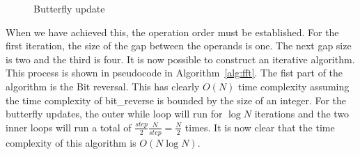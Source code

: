 \ifrelease
\begin{figure}
    \centering
    \caption{Butterfly update \cite{fft:derivation}}
    \label{fig:butterfly:update}
\end{figure}
\fi

When we have achieved this, the operation order must be established. For the first iteration, the size of the gap between the operands is one. The next gap size is two and the third is four. It is now possible to construct an iterative algorithm. This process is shown in pseudocode in Algorithm~\ref{alg:fft}. The fist part of the algorithm is the Bit reversal. This has clearly $O(N)$ time complexity assuming the time complexity of bit\_reverse is bounded by the size of an integer. For the butterfly updates, the outer while loop will run for $\log{}N$ iterations and the two inner loops will run a total of $\frac{step}{2} \frac{N}{step} = \frac{N}{2}$ times. It is now clear that the time complexity of this algorithm is $O(N\log{}N)$.


